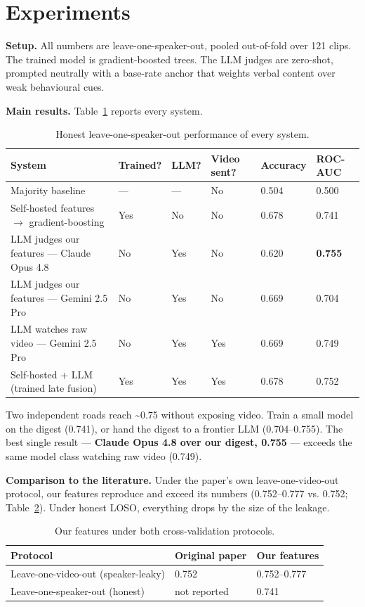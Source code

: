 \documentclass[11pt]{article}
\begin{document}
\section{Experiments}

\textbf{Setup.} All numbers are leave-one-speaker-out, pooled out-of-fold over 121 clips. The trained model is gradient-boosted trees. The LLM judges are zero-shot, prompted neutrally with a base-rate anchor that weights verbal content over weak behavioural cues.

\textbf{Main results.} Table~\ref{tab:results} reports every system.

\begin{table}[H]
\centering
\begin{tabular}{llllll}
\toprule
System & Trained? & LLM? & Video sent? & Accuracy & ROC-AUC \\
\midrule
Majority baseline & --- & --- & No & 0.504 & 0.500 \\
Self-hosted features $\rightarrow$ gradient-boosting & Yes & No & No & 0.678 & 0.741 \\
LLM judges our features --- Claude Opus 4.8 & No & Yes & No & 0.620 & \textbf{0.755} \\
LLM judges our features --- Gemini 2.5 Pro & No & Yes & No & 0.669 & 0.704 \\
LLM watches raw video --- Gemini 2.5 Pro & No & Yes & Yes & 0.669 & 0.749 \\
Self-hosted + LLM (trained late fusion) & Yes & Yes & Yes & 0.678 & 0.752 \\
\bottomrule
\end{tabular}
\caption{Honest leave-one-speaker-out performance of every system.}
\label{tab:results}
\end{table}

Two independent roads reach \textasciitilde{}0.75 without exposing video. Train a small model on the digest (0.741), or hand the digest to a frontier LLM (0.704--0.755). The best single result --- \textbf{Claude Opus 4.8 over our digest, 0.755} --- exceeds the same model class watching raw video (0.749).

\textbf{Comparison to the literature.} Under the paper's own leave-one-video-out protocol, our features reproduce and exceed its numbers (0.752--0.777 vs. 0.752; Table~\ref{tab:protocol}). Under honest LOSO, everything drops by the size of the leakage.

\begin{table}[H]
\centering
\begin{tabular}{lll}
\toprule
Protocol & Original paper & Our features \\
\midrule
Leave-one-video-out (speaker-leaky) & 0.752 & 0.752--0.777 \\
Leave-one-speaker-out (honest) & not reported & 0.741 \\
\bottomrule
\end{tabular}
\caption{Our features under both cross-validation protocols.}
\label{tab:protocol}
\end{table}
\end{document}
